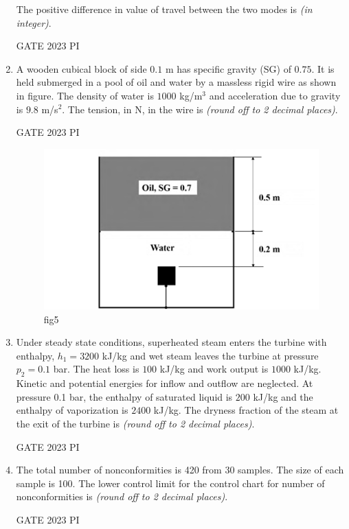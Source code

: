 \documentclass[journal,12pt,onecolumn]{IEEEtran}
\theoremstyle{remark}
\begin{document}
\begin{enumerate}
The positive difference in value of travel between the two modes is \underline{\hspace{2cm}} \textit{(in integer)}.

\hfill{GATE 2023 PI}

\item A wooden cubical block of side $0.1$ m has specific gravity (SG) of $0.75$. It is held submerged in a pool of oil and water by a massless rigid wire as shown in figure. The density of water is $1000$ kg/m$^3$ and acceleration due to gravity is $9.8$ m/s$^2$. The tension, in N, in the wire is \underline{\hspace{2cm}} \textit{(round off to 2 decimal places)}.

\hfill{GATE 2023 PI}


\begin{figure}[H]
    \centering
    \includegraphics[width=0.5\linewidth]{figs/Q.31.png}
    \caption{fig5}
    \label{fig:figs/Q.31.png}
\end{figure}



\item Under steady state conditions, superheated steam enters the turbine with enthalpy, $h_1 = 3200$ kJ/kg and wet steam leaves the turbine at pressure $p_2 = 0.1$ bar. The heat loss is $100$ kJ/kg and work output is $1000$ kJ/kg. Kinetic and potential energies for inflow and outflow are neglected. At pressure 0.1 bar, the enthalpy of saturated liquid is $200$ kJ/kg and the enthalpy of vaporization is $2400$ kJ/kg. The dryness fraction of the steam at the exit of the turbine is \underline{\hspace{2cm}} \textit{(round off to 2 decimal places)}.

\hfill{GATE 2023 PI}
\item The total number of nonconformities is 420 from 30 samples. The size of each sample is 100. The lower control limit for the control chart for number of nonconformities is \underline{\hspace{2cm}} \textit{(round off to 2 decimal places)}.

\hfill{GATE 2023 PI}


\end{enumerate}
\end{document}
